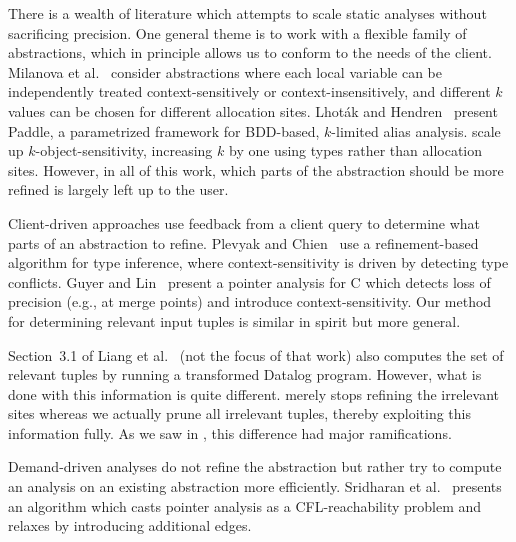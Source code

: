 
There is a wealth of literature which attempts to scale static analyses without
sacrificing precision.  One general theme is to work with a flexible family of
abstractions, which in principle allows us to conform to the needs of the
client.  Milanova et al.~\cite{kobj,MilanovaRountevRyder2005} consider
abstractions where each local variable can be independently treated
context-sensitively or context-insensitively, and different $k$ values can be
chosen for different allocation sites.  Lhot\'{a}k and
Hendren~\cite{LhotakHendren2006,LhotakHendren2008} present Paddle, a
parametrized framework for BDD-based, $k$-limited alias analysis.
\cite{smaragdakis11context} scale up $k$-object-sensitivity, increasing $k$ by one
using types rather than allocation sites.  However, in all of this work, which parts of the
abstraction should be more refined is largely left up to the user.

Client-driven approaches use feedback from a client query to determine what
parts of an abstraction to refine.
Plevyak and Chien~\cite{PlevyakChien1994} use a refinement-based algorithm for
type inference, where context-sensitivity is driven by detecting type conflicts.
Guyer and Lin~\cite{GuyerLin2003} present a pointer analysis for C
which detects loss of precision (e.g., at merge points) and introduce context-sensitivity.
Our method for determining relevant input tuples is similar in spirit but more general.

Section~3.1 of Liang et al.~\cite{liang11minimal} (not the focus of that work)
also computes the set of relevant tuples by running a transformed Datalog program.  However, what
is done with this information is quite different.  \cite{liang11minimal} merely
stops refining the irrelevant sites whereas we actually prune all irrelevant
tuples, thereby exploiting this information fully.  As we saw in
, this difference had major ramifications.


Demand-driven analyses \cite{HeintzeTardieu2001,ZhengRugina2008} do not refine
the abstraction but rather try to compute an analysis on an existing
abstraction more efficiently.
Sridharan et al.~\cite{SridharanBodik2006} presents an algorithm
which casts pointer analysis as a CFL-reachability problem and relaxes by
introducing additional edges.

